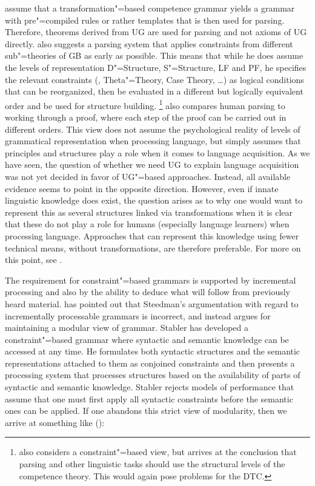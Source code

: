 \addlines[2]
\citet[]{FC96a-u} assume that a transformation"=based competence grammar yields a grammar with pre"=compiled
rules or rather templates that is then used for parsing.
Therefore, theorems derived from UG are used for parsing and not axioms of UG directly.
\citet{Johnson89a} also suggests a parsing system that applies constraints from different sub"=theories of GB as early as possible.
This means that while he does assume the levels of representation D"=Structure, S"=Structure, LF and PF, he specifies the relevant
constraints (\xbart, Theta"=Theory, Case Theory, \ldots) as logical
conditions that can be reorganized, then be evaluated in a different but logically
equivalent order and be used for structure building.%
\footnote{%
\citet[Section~15.7]{Stabler92a-u} also considers a constraint"=based view, but arrives at the conclusion that parsing and other linguistic
tasks should use the structural levels of the competence theory. This would again pose problems for the DTC.%
}
\citet[]{Chomsky2007a} also compares human parsing to working through a proof, where each step of the proof can be carried out in different
orders. This view does not assume the psychological reality of levels of grammatical representation when processing language, but simply assumes
that principles and structures play a role when it comes to language acquisition. 
As we have seen, the question of whether we need UG to explain language acquisition was not yet decided in favor of UG"=based approaches.
Instead, all available evidence seems to point in the opposite direction. However, even if innate linguistic knowledge does exist, the
question arises as to why one would want to represent this as several structures linked via transformations when it is clear that these do not play
a role for humans (especially language learners) when processing language.
Approaches that can represent this knowledge using fewer technical means, \eg without
transformations, are therefore preferable. For more on this point, see .

The requirement for constraint"=based grammars is supported by incremental processing and also by
the ability to deduce what will follow from previously heard material. \cite{Stabler91a} has pointed
out that Steedman's argumentation with regard to incrementally
processable grammars is incorrect, and instead argues for maintaining a modular view of
grammar. Stabler has developed a constraint"=based grammar where syntactic and semantic
knowledge can be accessed at any time. He formulates both syntactic structures and the semantic
representations attached to them as conjoined constraints and then presents a processing system
that processes structures based on the availability of parts of syntactic and semantic
knowledge. Stabler rejects models of performance that assume that one must first apply all syntactic
constraints before the semantic ones can be applied. If one abandons this strict view of modularity,
then we arrive at something like ():

